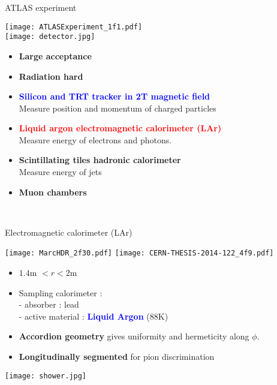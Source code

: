 \begin{frame}{ATLAS experiment}
  \begin{minipage}{0.49\linewidth}
    \texttt{[image: ATLASExperiment\_1f1.pdf]}\\
    \texttt{[image: detector.jpg]}
  \end{minipage}
  \hfill
  \begin{minipage}{0.49\linewidth}
    \begin{itemize}
    \item {\bf Large acceptance}
    \item {\bf Radiation hard}
      \newline
    \item \textcolor{blue}{\bf Silicon and TRT tracker in 2T magnetic field}\\
      Measure position and momentum of charged particles
    \item \textcolor{red}{\bf Liquid argon electromagnetic calorimeter (LAr)} \\
      Measure energy of electrons and photons.
    \item {\bf Scintillating tiles hadronic calorimeter} \\
      Measure energy of jets
    \item {\bf Muon chambers}
    \end{itemize}
  \end{minipage}\\
\end{frame}

\begin{frame}{ Electromagnetic calorimeter (LAr) }
  \begin{minipage}{0.4\linewidth}
    \texttt{[image: MarcHDR\_2f30.pdf]}\newline
    \centering
    \texttt{[image: CERN-THESIS-2014-122\_4f9.pdf]}
  \end{minipage}
  \hfill
  \begin{minipage}{0.59\linewidth}
    \begin{itemize}
    \item $1.4$m $<r<2$m
    \item Sampling calorimeter : \\
      - absorber : lead\\
      - active material : \textcolor{blue}{\bf Liquid Argon }($88$K)\\
    \item {\bf Accordion geometry} gives uniformity and hermeticity along $\phi$.
    \item {\bf Longitudinally segmented} for pion discrimination
      
    \end{itemize}
    \centering
    \texttt{[image: shower.jpg]}
  \end{minipage}
\end{frame}

